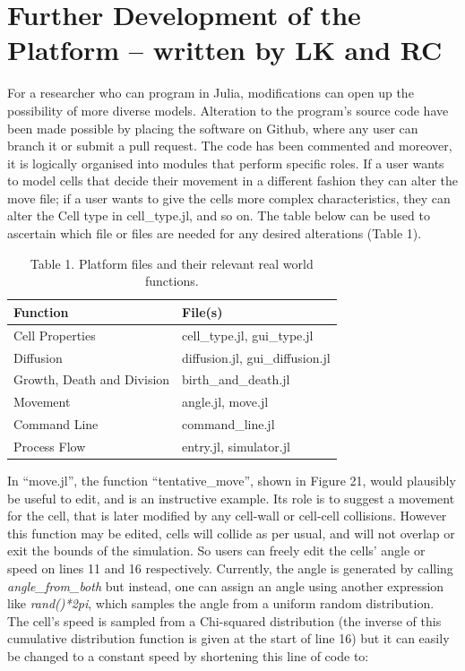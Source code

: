 \documentclass[12pt]{article}
\begin{document}
\section{Further Development of the Platform -- written by LK and RC}
For a researcher who can program in Julia, modifications can open up the 
possibility of more diverse models. Alteration to the program's source 
code have been made possible by placing the software on Github, where 
any user can branch it or submit a pull request. The code has been 
commented and moreover, it is logically organised into modules that 
perform specific roles. If a user wants to model cells that decide their 
movement in a different fashion they can alter the move file; if a user 
wants to give the cells more complex characteristics, they can alter the 
Cell type in cell\_type.jl, and so on. The table below can be used to 
ascertain which file or files are needed for any desired alterations 
(Table 1).

\begin{table}[H]
\centering
\begin{tabular}{ll}
\hline
{\bfseries Function} & {\bfseries File(s)} \\
\hline
Cell Properties & cell\_type.jl, gui\_type.jl \\
Diffusion & diffusion.jl, gui\_diffusion.jl \\
Growth, Death and Division & birth\_and\_death.jl \\
Movement & angle.jl, move.jl \\
Command Line & command\_line.jl \\
Process Flow & entry.jl, simulator.jl \\
\hline
\end{tabular}
\caption{Table 1. Platform files and their relevant real world 
functions.}
\end{table}

In ``move.jl'', the function ``tentative\_move'', shown in Figure 21, would plausibly be 
useful to edit, and is an instructive example. Its role is to suggest a 
movement for the cell, that is later modified by any cell-wall or 
cell-cell collisions. However this function may be edited, cells will 
collide as per usual, and will not overlap or exit the bounds of the 
simulation. So users can freely edit the cells' angle or speed on lines 
11 and 16 respectively. Currently, the angle is generated by calling 
{\itshape angle\_from\_both} but instead, one can assign an angle using 
another expression like {\itshape rand()*2pi}, which samples the angle 
from a uniform random distribution. The cell's speed is sampled from a 
Chi-squared distribution (the inverse of this cumulative distribution 
function is given at the start of line 16) but it can easily be changed 
to a constant speed by shortening this line of code to:
\end{document}
